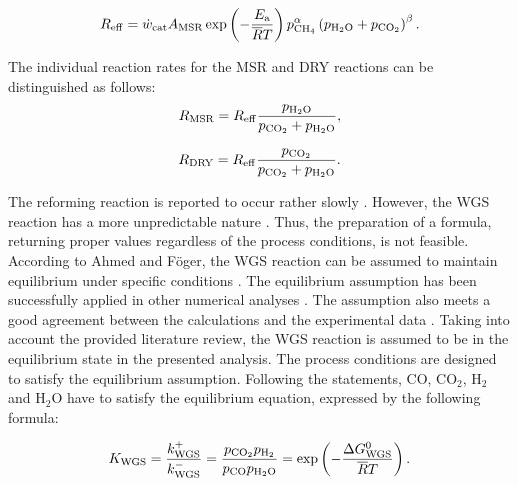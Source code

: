 \documentclass[preprint,12pt]{elsarticle}
\begin{document}
\begin{equation}
\label{eq:rate_eff}
R_{\rm{eff}}=\dot{w}_{\rm{cat}} A_{\rm{MSR}} \exp \left(-\frac{E_{\rm{a}}}{\overline{R}T}  \right) p_{\rm{CH_4}}^\alpha \left(p_{\rm{H_2O}} + p_{\rm{CO_2}}\right)^\beta.
\end{equation}
 
 \vspace{3mm}
 
 The individual reaction rates for the MSR and DRY reactions can be distinguished as follows: 
\begin{equation}
\label{eq:rate_MSR}
R_{\rm{MSR}} = R_{\rm{eff}}\frac{p_{\rm{H_2O}}}{p_{\rm{CO_2}} + p_{\rm{H_2O}}},
\end{equation}

\begin{equation}
\label{eq:rate_DRY}
R_{\rm{DRY}} = R_{\rm{eff}}\frac{p_{\rm{CO_2}}}{p_{\rm{CO_2}} + p_{\rm{H_2O}}}.
\end{equation}

\vspace{3mm}
 
The reforming reaction is reported to occur rather slowly \cite{Brus2012JPCS}. However, the WGS reaction has a more unpredictable nature \cite{Nagata2001}. Thus, the preparation of a formula, returning proper values regardless of the process conditions, is not feasible. According to Ahmed and F\"{o}ger, the WGS reaction can be assumed to maintain equilibrium under specific conditions \cite{Ahmed2001}. The equilibrium assumption has been successfully applied in other numerical analyses \cite{Iwai2011, Sciazko2014IJHE, Peng2022}. The assumption also meets a good agreement between the calculations and the experimental data \cite{Brus2012IJHE, Sciazko2013, Sciazko2014JPS}. Taking into account the provided literature review, the WGS reaction is assumed to be in the equilibrium state in the presented analysis. The process conditions are designed to satisfy the equilibrium assumption. Following the statements, CO, CO$_{2}$, H$_{2}$ and H$_{2}$O have to satisfy the equilibrium equation, expressed by the following formula:  

\begin{equation} 
\label{eq:K_WGS}
K_{\rm{WGS}} = \dfrac{ k_{\rm{WGS}}^+}{k_{\rm{WGS}}^-} = \dfrac{p_{\rm{CO_2}} p_{\rm{H_2}}}{p_{\rm{CO}} p_{\rm{H_2O}}} = \exp \left( -\dfrac{\Delta G_{\rm{WGS}}^0}{\overline{R}T} \right).
 \end{equation}

\vspace{3mm}
\end{document}
